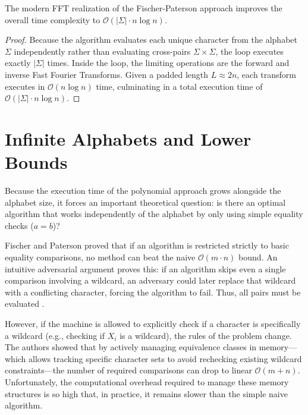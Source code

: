 \begin{theorem}
The modern FFT realization of the Fischer-Paterson approach improves the overall time complexity to $\mathcal{O}(|\Sigma| \cdot n \log n)$.
\end{theorem}
\begin{proof}
Because the algorithm evaluates each unique character from the alphabet $\Sigma$ independently rather than evaluating cross-pairs $\Sigma \times \Sigma$, the loop executes exactly $|\Sigma|$ times. Inside the loop, the limiting operations are the forward and inverse Fast Fourier Transforms. Given a padded length $L \approx 2n$, each transform executes in $\mathcal{O}(n \log n)$ time, culminating in a total execution time of $\mathcal{O}(|\Sigma| \cdot n \log n)$.
\end{proof}

\section{Infinite Alphabets and Lower Bounds}
Because the execution time of the polynomial approach grows alongside the alphabet size, it forces an important theoretical question: is there an optimal algorithm that works independently of the alphabet by only using simple equality checks ($a = b$)?

Fischer and Paterson proved that if an algorithm is restricted strictly to basic equality comparisons, no method can beat the naive $\mathcal{O}(m \cdot n)$ bound. An intuitive adversarial argument proves this: if an algorithm skips even a single comparison involving a wildcard, an adversary could later replace that wildcard with a conflicting character, forcing the algorithm to fail. Thus, all pairs must be evaluated \cite{fp1974}.

However, if the machine is allowed to explicitly check if a character is specifically a wildcard (e.g., checking if $X_i$ is a wildcard), the rules of the problem change. The authors showed that by actively managing equivalence classes in memory—which allows tracking specific character sets to avoid rechecking existing wildcard constraints—the number of required comparisons can drop to linear $\mathcal{O}(m+n)$. Unfortunately, the computational overhead required to manage these memory structures is so high that, in practice, it remains slower than the simple naive algorithm.